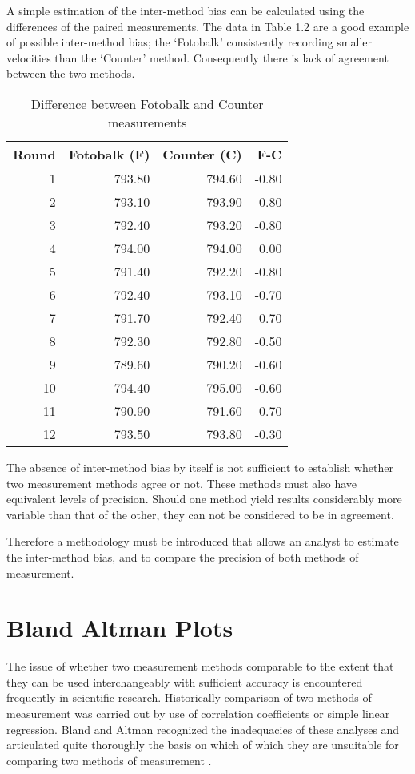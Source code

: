 \documentclass{report}
\begin{document}
A simple estimation of the inter-method bias can be calculated
using the differences of the paired measurements. The data in
Table 1.2 are a good example of possible inter-method bias; the
`Fotobalk' consistently recording smaller velocities than the
`Counter' method. Consequently there is lack of agreement between
the two methods.
\newpage
\begin{table}[h!]
	\begin{center}
		
		\begin{tabular}{rrrr}
			\hline
			Round& Fotobalk (F) & Counter (C) & F-C \\
			\hline
			1 & 793.80 & 794.60 & -0.80 \\
			2 & 793.10 & 793.90 & -0.80 \\
			3 & 792.40 & 793.20 & -0.80 \\
			4 & 794.00 & 794.00 & 0.00 \\
			5 & 791.40 & 792.20 & -0.80 \\
			6 & 792.40 & 793.10 & -0.70 \\
			7 & 791.70 & 792.40 & -0.70 \\
			8 & 792.30 & 792.80 & -0.50 \\
			9 & 789.60 & 790.20 & -0.60 \\
			10 & 794.40 & 795.00 & -0.60 \\
			11 & 790.90 & 791.60 & -0.70 \\
			12 & 793.50 & 793.80 & -0.30 \\
			\hline
		\end{tabular}
		\caption{Difference between Fotobalk and Counter measurements}
	\end{center}
\end{table}

\bigskip

\noindent The absence of inter-method bias by itself is not
sufficient to establish whether two measurement methods agree or
not. These methods must also have equivalent levels of precision.
Should one method yield results considerably more variable than
that of the other, they can not be considered to be in agreement.

Therefore a methodology must be introduced that allows an analyst
to estimate the inter-method bias, and to compare the precision of
both methods of measurement.
\newpage
\section{Bland Altman Plots}
The issue of whether two measurement methods comparable to the
extent that they can be used interchangeably with sufficient
accuracy is encountered frequently in scientific research.
Historically comparison of two methods of measurement was carried
out by use of correlation coefficients or simple linear
regression. Bland and Altman recognized the inadequacies of these
analyses and articulated quite thoroughly the basis on which of
which they are unsuitable for comparing two methods of measurement
\citep*{BA83}.
\end{document}
